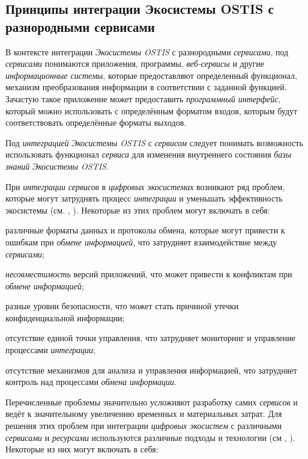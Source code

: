 \subsection{Принципы интеграции Экосистемы OSTIS с разнородными сервисами}
{\label{sec_integration_services}} 

В контексте интеграции \textit{Экосистемы OSTIS} с разнородными \textit{сервисами}, под \textit{сервисами} понимаются приложения, программы, \textit{веб-сервисы} и другие \textit{информационные системы}, которые предоставляют определенный функционал, механизм преобразования информации в соответствии с заданной функцией. Зачастую такое приложение может предоставить \textit{программный интерфейс}, который можно использовать с определённым форматом входов, которым будут соответствовать определённые форматы выходов.

Под \textit{интеграцией} \textit{Экосистемы OSTIS} с \textit{сервисом} следует понимать возможность использовать функционал \textit{сервиса} для изменения внутреннего состояния \textit{базы знаний} \textit{Экосистемы OSTIS}. 

При \textit{интеграции} \textit{сервисов} в \textit{цифровых экосистемах} возникают ряд проблем, которые могут затруднять процесс \textit{интеграции} и уменьшать эффективность экосистемы (см. , ). Некоторые из этих проблем могут включать в себя:

\begin{textitemize}
    \item различные форматы данных и протоколы обмена, которые могут привести к ошибкам при \textit{обмене информацией}, что затрудняет взаимодействие между \textit{сервисами};
    \item \textit{несовместимость} версий приложений, что может привести к конфликтам при \textit{обмене информацией};
    \item разные уровни безопасности, что может стать причиной утечки конфиденциальной информации;
    \item отсутствие единой точки управления, что затрудняет мониторинг и управление процессами \textit{интеграции};
    \item отсутствие механизмов для анализа и управления информацией, что затрудняет контроль над процессами \textit{обмена информации}.
\end{textitemize}

Перечисленные проблемы значительно усложняют разработку самих \textit{сервисов} и ведёт к значительному увеличению временных и материальных затрат. Для решения этих проблем при интеграции \textit{цифровых экосистем} с различными \textit{сервисами} и \textit{ресурсами} используются различные подходы и технологии (см , ). Некоторые из них могут включать в себя:

